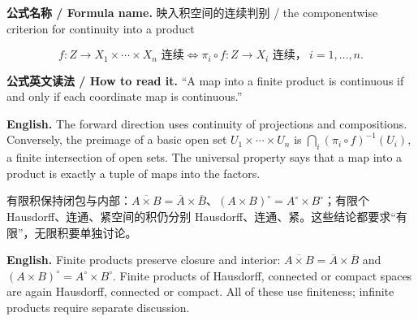 \documentclass[UTF8,11pt,a4paper]{ctexart}
\newcommand{\EN}[1]{\par\noindent\textbf{English.} #1\par}
\newcommand{\READ}[1]{\par\noindent\textbf{公式英文读法 / How to read it.} #1\par}
\newcommand{\FORMULA}[2]{\par\noindent\textbf{公式名称 / Formula name.} #1 / #2\par}
\begin{document}
\FORMULA{映入积空间的连续判别}{the componentwise criterion for continuity into a product}
\[
f:Z\to X_1\times\cdots\times X_n\text{ 连续}
\iff
\pi_i\circ f:Z\to X_i\text{ 连续，}\ i=1,\dots,n .
\]
\READ{``A map into a finite product is continuous if and only if each coordinate map is continuous.''}
\EN{The forward direction uses continuity of projections and compositions. Conversely, the preimage of a basic open set $U_1\times\cdots\times U_n$ is $\bigcap_i(\pi_i\circ f)^{-1}(U_i)$, a finite intersection of open sets. The universal property says that a map into a product is exactly a tuple of maps into the factors.}

\noindent 有限积保持闭包与内部：$\overline{A\times B}=\overline A\times\overline B$、$(A\times B)^\circ=A^\circ\times B^\circ$；有限个 Hausdorff、连通、紧空间的积仍分别 Hausdorff、连通、紧。这些结论都要求“有限”，无限积要单独讨论。
\EN{Finite products preserve closure and interior: $\overline{A\times B}=\overline A\times\overline B$ and $(A\times B)^\circ=A^\circ\times B^\circ$. Finite products of Hausdorff, connected or compact spaces are again Hausdorff, connected or compact. All of these use finiteness; infinite products require separate discussion.}
\end{document}
